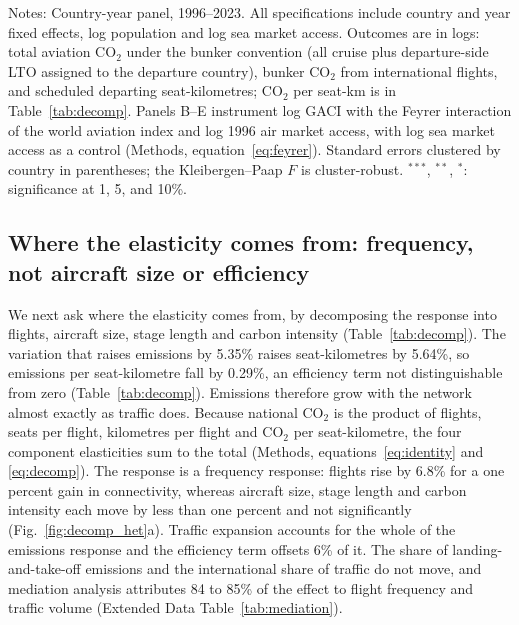 \documentclass[12pt]{extarticle}
\begin{document}
\begin{table}[H]
{\begin{threeparttable}
\begin{tabular}{lccc}
\bottomrule
\end{tabular}
\begin{tablenotes}[flushleft]
\footnotesize
\item Notes: Country-year panel, 1996--2023. All specifications include country and year fixed effects, log population and log sea market access. Outcomes are in logs: total aviation CO$_2$ under the bunker convention (all cruise plus departure-side LTO assigned to the departure country), bunker CO$_2$ from international flights, and scheduled departing seat-kilometres; CO$_2$ per seat-km is in Table~\ref{tab:decomp}. Panels B--E instrument log GACI with the Feyrer interaction of the world aviation index and log 1996 air market access, with log sea market access as a control (Methods, equation~\ref{eq:feyrer}). Standard errors clustered by country in parentheses; the Kleibergen--Paap $F$ is cluster-robust. $^{***}$, $^{**}$, $^{*}$: significance at 1, 5, and 10\%.
\end{tablenotes}
\end{threeparttable}}
\end{table}

\subsection*{Where the elasticity comes from: frequency, not aircraft size
or efficiency}
We next ask where the elasticity comes from, by decomposing the
response into flights, aircraft size, stage length and carbon intensity
(Table~\ref{tab:decomp}). The variation that raises emissions by 5.35\% raises seat-kilometres by 5.64\%, so emissions per seat-kilometre fall by
0.29\%, an efficiency term not distinguishable from zero
(Table~\ref{tab:decomp}). Emissions therefore grow with the network
almost exactly as traffic does. Because national CO$_2$ is the product of
flights, seats per flight, kilometres per flight and CO$_2$ per
seat-kilometre, the four component elasticities sum to the total
(Methods, equations~\ref{eq:identity} and \ref{eq:decomp}). The response is a frequency response: flights rise by 6.8\% for a one percent gain in connectivity, whereas aircraft size,
stage length and carbon intensity each move by less than one percent and
not significantly (Fig.~\ref{fig:decomp_het}a). Traffic
expansion accounts for the whole of the emissions response and the
efficiency term offsets 6\% of it. The share of
landing-and-take-off emissions and the international share of traffic do
not move, and mediation analysis attributes 84 to 85\% of the effect
to flight frequency and traffic volume (Extended Data
Table~\ref{tab:mediation}).
\end{document}
